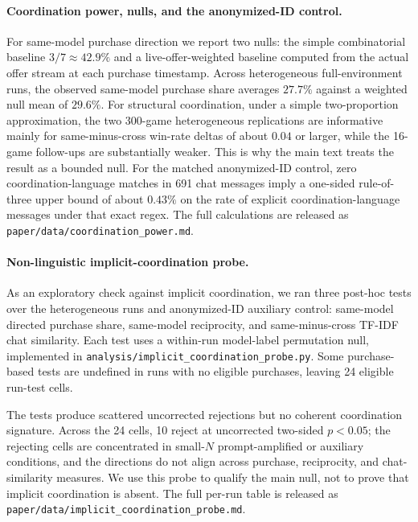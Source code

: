 \documentclass{article}
\begin{document}
\paragraph{Coordination power, nulls, and the anonymized-ID control.}
\label{app:coordination-power}
For same-model purchase direction we report two nulls: the simple combinatorial baseline $3/7 \approx 42.9\%$ and a live-offer-weighted baseline computed from the actual offer stream at each purchase timestamp.
Across heterogeneous full-environment runs, the observed same-model purchase share averages $27.7\%$ against a weighted null mean of $29.6\%$.
For structural coordination, under a simple two-proportion approximation, the two 300-game heterogeneous replications are informative mainly for same-minus-cross win-rate deltas of about $0.04$ or larger, while the 16-game follow-ups are substantially weaker.
This is why the main text treats the result as a bounded null.
For the matched anonymized-ID control, zero coordination-language matches in 691 chat messages imply a one-sided rule-of-three upper bound of about $0.43\%$ on the rate of explicit coordination-language messages under that exact regex.
The full calculations are released as \texttt{paper/data/coordination\_power.md}.

\paragraph{Non-linguistic implicit-coordination probe.}
As an exploratory check against implicit coordination, we ran three post-hoc tests over the heterogeneous runs and anonymized-ID auxiliary control: same-model directed purchase share, same-model reciprocity, and same-minus-cross TF-IDF chat similarity.
Each test uses a within-run model-label permutation null, implemented in \texttt{analysis/implicit\_coordination\_probe.py}.
Some purchase-based tests are undefined in runs with no eligible purchases, leaving 24 eligible run-test cells.

The tests produce scattered uncorrected rejections but no coherent coordination signature.
Across the 24 cells, 10 reject at uncorrected two-sided $p < 0.05$; the rejecting cells are concentrated in small-$N$ prompt-amplified or auxiliary conditions, and the directions do not align across purchase, reciprocity, and chat-similarity measures.
We use this probe to qualify the main null, not to prove that implicit coordination is absent.
The full per-run table is released as \texttt{paper/data/implicit\_coordination\_probe.md}.
\end{document}
